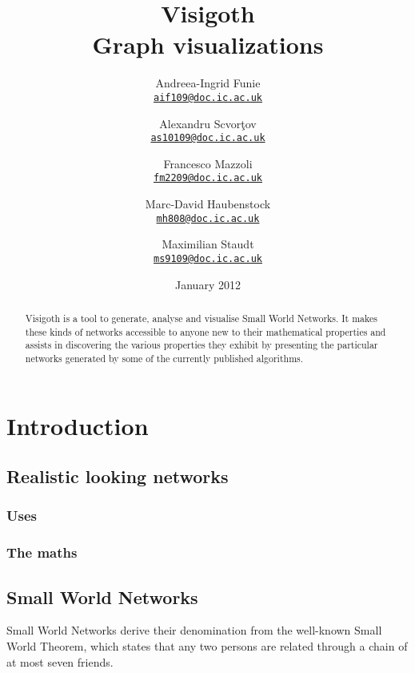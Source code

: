 \documentclass[a4paper,11pt,titlepage]{article}
\newcommand{\mailto}[1]{\href{mailto:#1}{\texttt{#1}}}
\let\stdsection\section         %
\renewcommand{\section}{\newpage\stdsection}
\begin{document}
\title{\Huge Visigoth\\\Large Graph visualizations}
\author{
  Andreea-Ingrid Funie\\\mailto{aif109@doc.ic.ac.uk}\and
  Alexandru Scvor\c tov\\\mailto{as10109@doc.ic.ac.uk}\and
  Francesco Mazzoli\\\mailto{fm2209@doc.ic.ac.uk}\and
  Marc-David Haubenstock\\\mailto{mh808@doc.ic.ac.uk}\and
  Maximilian Staudt\\\mailto{ms9109@doc.ic.ac.uk}
}
\date{January 2012}
\maketitle

\begin{abstract}
Visigoth is a tool to generate, analyse and visualise Small World
Networks. It makes these kinds of networks accessible to anyone new to
their mathematical properties and assists in discovering the various
properties they exhibit by presenting the particular networks
generated by some of the currently published algorithms.
\end{abstract}

\tableofcontents

\section{Introduction}

\subsection{Realistic looking networks}

\subsubsection{Uses}

\subsubsection{The maths}

\subsection{Small World Networks}

Small World Networks derive their denomination from the well-known
Small World Theorem, which states that any two persons are related
through a chain of at most seven friends.
\end{document}
